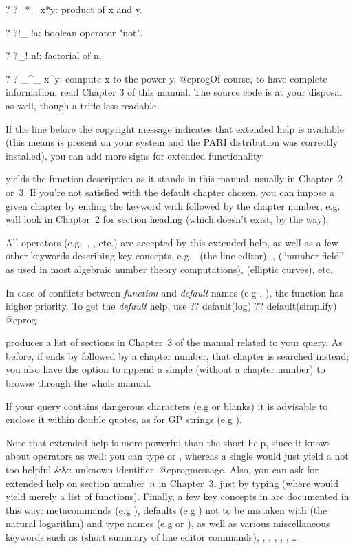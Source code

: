  ?  ?_*_
 x*y: product of x and y.

 ?  ?!_
 !a: boolean operator "not".

 ?  ?_!
 n!: factorial of n.

 ?  ? _^_
 x^y: compute x to the power y.
 @eprog\noindent Of course, to have complete information, read Chapter 3 of
this manual. The source code is at your disposal as well, though a trifle
less readable.

If the line before the copyright message indicates that extended help is
available (this means  is present on your system and the PARI
distribution was correctly installed), you can add more  signs for
extended functionality:

 yields the function description as it stands in this
manual, usually in Chapter~2 or~3. If you're not satisfied with the default
chapter chosen, you can impose a given chapter by ending the keyword with
 followed by the chapter number, e.g.~ will look in
Chapter~2 for section heading  (which doesn't exist, by the way).

All operators (e.g.~\kbd{+}, \kbd{\&\&}, etc.) are accepted by this
extended help, as well as a few other keywords describing key  concepts,
e.g.~ (the line editor), ,  (``number
field'' as used in most algebraic number theory computations), 
(elliptic curves), etc.

In case of conflicts between \emph{function} and \emph{default} names (e.g
, ), the function has higher priority. To get the
\emph{default} help, use
\bprog
  ?? default(log)
  ?? default(simplify)
@eprog

 produces a list of sections in Chapter~3 of the
manual related to your query. As before, if  ends by 
followed by a chapter number, that chapter is searched instead; you also
have the option to append a simple  (without a chapter number) to
browse through the whole manual.

If your query contains dangerous characters (e.g  or blanks) it is
advisable to enclose it within double quotes, as for GP strings (e.g
).

Note that extended help is more powerful than the short help, since
it knows about operators as well: you can type  or
, whereas a single  would just yield a not too helpful
\bprog
&&: unknown identifier.
@eprog\noindent message. Also, you can ask for extended help on section
number~$n$ in Chapter~3, just by typing  (where  would
yield merely a list of functions). Finally, a few key concepts in  are
documented in this way: metacommands (e.g ), defaults (e.g
) not to be mistaken with  (the natural
logarithm) and type names (e.g  or ), as well as
various miscellaneous keywords such as  (short summary of line
editor commands), , , ,
, , \dots

